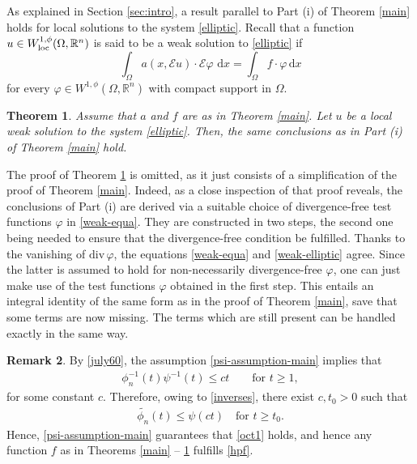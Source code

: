 \documentclass[leqno,11pt]{amsart}%
\numberwithin{equation}{section}
\newcommand{\dive}{\mathrm{div}\,}
\def\real{\mathbb R}
\def\Rn{{\mathbb R}^{n}}
\def\d{\mathrm{d}}
\def\E{\mathcal{E}}
\def\dx{\d x}
\newtheorem{thm}{Theorem}[section]
\theoremstyle{definition}
\newtheorem{rem}[thm]{Remark}
\numberwithin{equation}{section}
\begin{document}
As explained in Section \ref{sec:intro}, a  result parallel to Part (i) of Theorem \ref{main} holds for local solutions to the system \eqref{elliptic}. Recall that a function $u \in W^{1,\phi}_{\rm loc}(\Omega, \Rn)$ is said to be a weak solution to \eqref{elliptic} if 
\begin{equation}\label{weak-elliptic}
  \int_{\Omega} a(x,\E
  u)\cdot\E\varphi \,\,\dx
  =
  \int_{\Omega}f\cdot\varphi\,\dx
\end{equation}
 for every  $\varphi\in  W^{1,\phi}(\Omega,\real^n)$ with compact support in $\Omega$.
 
\begin{thm}\label{main1}
   Assume that $a$ and $f$ are as in Theorem \ref{main}. Let $u$ be a local weak solution to the system \eqref{elliptic}. Then, the same conclusions as in Part (i) of Theorem \ref{main} hold.
\end{thm}
 The proof of Theorem \ref{main1}
is omitted, as it just consists of a simplification of the proof of Theorem \ref{main}. Indeed, as  a close inspection of that proof reveals, the conclusions of Part (i) are derived via a suitable choice of divergence-free test functions $\varphi$ in \eqref{weak-equa}. They are constructed in two steps, the second one being needed to ensure that the divergence-free condition be fulfilled.
Thanks to the vanishing of $\dive \varphi$, the equations \eqref{weak-equa}
and  \eqref{weak-elliptic} agree. Since the latter is assumed to hold for non-necessarily divergence-free $\varphi$, one can just make use of the test functions $\varphi$ obtained in the first step. This entails an integral identity of the same form as in the proof of Theorem \ref{main}, save that some  terms are now missing. The  terms which are still present can be handled exactly in the same way.

 


\begin{rem}\label{rem:oct}
    By \eqref{july60}, the assumption \eqref{psi-assumption-main} implies that
    \begin{align}
        \label{july61}
       \phi_{n}^{-1}(t) \psi^{-1}(t)\le  c t
  \qquad\mbox{for}\,\, t\geq 1,
    \end{align}
    for some constant $c$.  Therefore, owing to \eqref{inverses}, there exist $c,t_0 >0$ such that
    \begin{align}
        \label{july62}
        \widetilde {\phi_n} (t)\leq \psi (ct) \quad \text{for $t \geq t_0$.}
    \end{align}
    Hence,  \eqref{psi-assumption-main} guarantees that \eqref{oct1} holds, and hence any function $f$ as in Theorems \ref{main} -- \ref{main1} fulfills \eqref{hpf}.
\end{rem}
\end{document}
